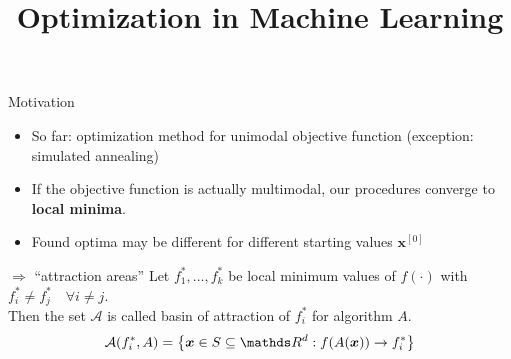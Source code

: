 \documentclass[11pt,compress,t,notes=noshow, xcolor=table]{beamer}
\title{Optimization in Machine Learning}
\date{}
\begin{document}
\sloppy


\begin{vbframe}{Motivation}
\begin{itemize}
\item So far: optimization method for unimodal objective function (exception: simulated annealing)
\item If the objective function is actually multimodal, our procedures converge to \textbf{local minima}.
\item Found optima may be different for different starting values $\bm{x}^{[0]}$
\end{itemize}
\begin{block}{$\Rightarrow$ \enquote{attraction areas}}
Let $f_1^*, \ldots, f_k^*$ be local minimum values of $f(\cdot)$
with $f_i^* \neq f_j^* \quad \forall i \neq j$. \\
Then the set $\mathcal{A}$ is called basin of attraction of $f_i^*$ for algorithm $A$.
$$
\mathcal{A}(f_i^*, A) = \left\{ \bm{x} \in S \subseteq \R^d : f(A(\bm{x}))
\rightarrow f_i^*\right\}
$$

\end{block}
\end{vbframe}
\end{document}
